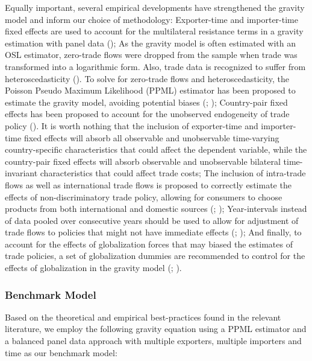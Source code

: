 Equally important, several empirical developments have strengthened the
gravity model and inform our choice of methodology: Exporter-time and
importer-time fixed effects are used to account for the multilateral
resistance terms in a gravity estimation with panel data (\cite{olivero_dynamic_2012});
 As the gravity model is often estimated with an OSL
estimator, zero-trade flows were dropped from the sample when trade was
transformed into a logarithmic form. Also, trade data is recognized to
suffer from heteroscedasticity (\cite{yotov_advanced_2016}). To solve for
zero-trade flows and heteroscedasticity, the Poisson Pseudo Maximum
Likelihood (PPML) estimator has been proposed to estimate the gravity
model, avoiding potential biases (\cite{silva_log_2006}; \cite{santos_silva_further_2011});
 Country-pair fixed effects has been proposed to
account for the unobserved endogeneity of trade policy (\cite{baier_free_2007-1}). It is worth nothing that the inclusion of
exporter-time and importer-time fixed effects will absorb all observable
and unobservable time-varying country-specific characteristics that
could affect the dependent variable, while the country-pair fixed
effects will absorb observable and unobservable bilateral time-invariant
characteristics that could affect trade costs; The inclusion of
intra-trade flows as well as international trade flows is proposed to
correctly estimate the effects of non-discriminatory trade policy,
allowing for consumers to choose products from both international and
domestic sources (\cite{dai_trade-diversion_2014}; \cite{heid_estimating_2017}); Year-intervals instead of data pooled over consecutive years
should be used to allow for adjustment of trade flows to policies that
might not have immediate effects (\cite{baier_free_2007-2}; \cite{anderson_terms_2016-1}); And finally, to account for the effects of
globalization forces that may biased the estimates of trade policies, a
set of globalization dummies are recommended to control for the effects
of globalization in the gravity model (\cite{yotov_simple_2012}; \cite{bergstrand_economic_2015}).
%
\subsubsection{Benchmark Model}%
\label{ssubsec:BenchmarkModel}%

%
Based on the theoretical and empirical best-practices found in the
relevant literature, we employ the following gravity equation using a
PPML estimator and a balanced panel data approach with multiple
exporters, multiple importers and time as our benchmark model:

